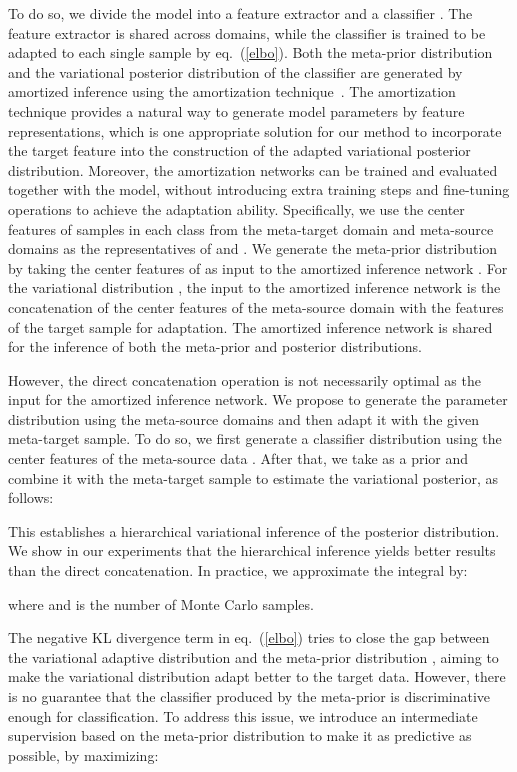 \documentclass{article} \usepackage[table]{xcolor}
\begin{document}
To do so, we divide the model  into a feature extractor  and a classifier . The feature extractor is shared across domains, while the classifier is trained to be adapted to each single sample by eq.~(\ref{elbo}). 
Both the meta-prior distribution  and the variational posterior distribution  of the classifier  are generated by amortized inference using the amortization technique~\citep{kingma2013auto, gershman2014amortized,gordon2018meta, shen2021variational}.
The amortization technique provides a natural way to generate model parameters by feature representations, which is one appropriate solution for our method to incorporate the target feature into the construction of the adapted variational posterior distribution. Moreover, the amortization networks can be trained and evaluated together with the model, without introducing extra training steps and fine-tuning operations to achieve the adaptation ability.
Specifically, we use the center features of samples in each class from the meta-target domain and meta-source domains as the representatives of  and . 
We generate the meta-prior distribution  by taking the center features of  as input to the amortized inference network . For the variational distribution , the input to the amortized inference network is the concatenation of the center features of the meta-source domain  with the features of the target sample  for adaptation. 
The amortized inference network  is shared for the inference of both the meta-prior and posterior distributions.

However, the direct concatenation operation is not necessarily optimal as the input for the amortized inference network. 
We propose to generate the parameter distribution using the meta-source domains and then adapt it with the given meta-target sample.
To do so, we first generate a classifier distribution  using the center features of the meta-source data .
After that, we take  as a prior and combine it with the meta-target sample to estimate the variational posterior, as follows:

This establishes a hierarchical variational inference of the posterior distribution. We show in our experiments that the hierarchical inference yields better results than the direct concatenation.
In practice, we approximate the integral by:

where  and  is the number of Monte Carlo samples.

The negative KL divergence term in eq.~(\ref{elbo}) tries to close the gap between the variational adaptive distribution  and the meta-prior distribution , aiming to make the variational distribution adapt better to the target data. However, there is no guarantee that the classifier produced by the meta-prior is discriminative enough for classification.
To address this issue, we introduce an intermediate supervision based on the meta-prior distribution to make it as predictive as possible, by maximizing: 
\end{document}
